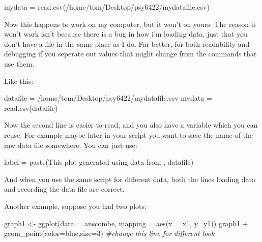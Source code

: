 \documentclass[
  12pt,
  a5paper,
]{book}
\newenvironment{Shaded}{\begin{snugshade}}{\end{snugshade}}
\newcommand{\AttributeTok}[1]{\textcolor[rgb]{0.77,0.63,0.00}{#1}}
\newcommand{\CommentTok}[1]{\textcolor[rgb]{0.56,0.35,0.01}{\textit{#1}}}
\newcommand{\DecValTok}[1]{\textcolor[rgb]{0.00,0.00,0.81}{#1}}
\newcommand{\FunctionTok}[1]{\textcolor[rgb]{0.00,0.00,0.00}{#1}}
\newcommand{\NormalTok}[1]{#1}
\newcommand{\OtherTok}[1]{\textcolor[rgb]{0.56,0.35,0.01}{#1}}
\newcommand{\SpecialCharTok}[1]{\textcolor[rgb]{0.00,0.00,0.00}{#1}}
\newcommand{\StringTok}[1]{\textcolor[rgb]{0.31,0.60,0.02}{#1}}
\begin{document}
\begin{Shaded}
\begin{Highlighting}[]
\NormalTok{mydata }\OtherTok{=} \FunctionTok{read.csv}\NormalTok{(}\StringTok{\textquotesingle{}/home/tom/Desktop/psy6422/mydatafile.csv\textquotesingle{}}\NormalTok{)}
\end{Highlighting}
\end{Shaded}

Now this happens to work on my computer, but it won't on yours. The reason it won't work isn't because there is a bug in how i'm loading data, just that you don't have a file in the same place as I do. Far better, for both readability and debugging if you seperate out values that might change from the commands that use them.

Like this:

\begin{Shaded}
\begin{Highlighting}[]
\NormalTok{datafile }\OtherTok{=} \StringTok{\textquotesingle{}/home/tom/Desktop/psy6422/mydatafile.csv\textquotesingle{}}
\NormalTok{mydata }\OtherTok{=} \FunctionTok{read.csv}\NormalTok{(datafile)}
\end{Highlighting}
\end{Shaded}

Now the second line is easier to read, and you also have a variable which you can reuse. For example maybe later in your script you want to save the name of the raw data file somewhere. You can just use:

\begin{Shaded}
\begin{Highlighting}[]
\NormalTok{label }\OtherTok{=} \FunctionTok{paste}\NormalTok{(}\StringTok{\textquotesingle{}This plot generated using data from \textquotesingle{}}\NormalTok{, datafile)}
\end{Highlighting}
\end{Shaded}

And when you use the same script for different data, both the lines loading data and recording the data file are correct.

Another example, suppose you had two plots:

\begin{Shaded}
\begin{Highlighting}[]
\NormalTok{graph1 }\OtherTok{\textless{}{-}} \FunctionTok{ggplot}\NormalTok{(}\AttributeTok{data =}\NormalTok{ anscombe, }\AttributeTok{mapping =} \FunctionTok{aes}\NormalTok{(}\AttributeTok{x =}\NormalTok{ x1, }\AttributeTok{y=}\NormalTok{y1))}
\NormalTok{graph1 }\SpecialCharTok{+} \FunctionTok{geom\_point}\NormalTok{(}\AttributeTok{color=}\StringTok{\textquotesingle{}blue\textquotesingle{}}\NormalTok{,}\AttributeTok{size=}\DecValTok{3}\NormalTok{) }\CommentTok{\#change this line for different look}
\end{Highlighting}
\end{Shaded}
\end{document}
